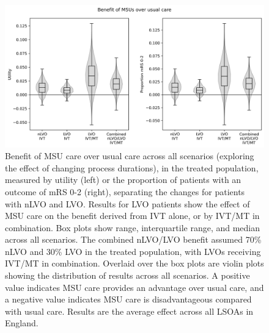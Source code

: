 \begin{figure}[h!]
    \centering
    \includegraphics[width=0.75\linewidth]{images/scenario_results_summary.png}
    \caption{Benefit of MSU care over usual care across all scenarios (exploring the effect of changing process durations), in the treated population, measured by utility (left) or the proportion of patients with an outcome of mRS 0-2 (right), separating the changes for patients with nLVO and LVO. Results for LVO patients show the effect of MSU care on the benefit derived from IVT alone, or by IVT/MT in combination. Box plots show range, interquartile range, and median across all scenarios. The combined nLVO/LVO benefit assumed 70\% nLVO and 30\% LVO in the treated population, with LVOs receiving IVT/MT in combination. Overlaid over the box plots are violin plots showing the distribution of results across all scenarios. A positive value indicates MSU care provides an advantage over usual care, and a negative value indicates MSU care is disadvantageous compared with usual care. Results are the average effect across all LSOAs in England.}
    \label{fig:scenarios_overview}
    
\end{figure}
